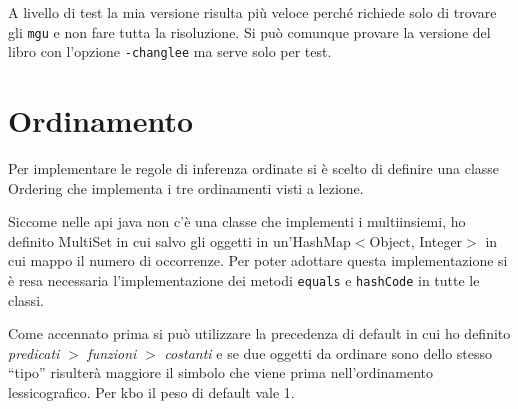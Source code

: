 \documentclass[a4paper,11pt]{article} %
\newcommand{\sintassi}{\texttt}
\newcommand{\classe}{\textsf}
\newcommand{\metodo}{\texttt}
\newcommand{\cod}{\lstset{basicstyle=\ttfamily}\lstinline}
\begin{document}
A livello di test la mia versione risulta più veloce perché richiede solo di trovare
gli \metodo{mgu} e non fare tutta la risoluzione. %
Si può comunque provare la versione del libro con %
l'opzione
\sintassi{-changlee} %
ma serve solo per test.


\section{Ordinamento}\label{sec: ordinamento}
Per implementare le regole di inferenza ordinate si è
scelto di definire una classe \classe{Ordering}
che implementa i tre ordinamenti visti a lezione.

Siccome nelle api java non c'è una classe che implementi
i multiinsiemi, ho definito \classe{MultiSet} in cui 
salvo gli oggetti in %
un'\classe{HashMap$<$Object, Integer$>$} in cui mappo il numero di occorrenze.  
Per poter adottare questa implementazione si è resa 
necessaria l'implementazione dei metodi \metodo{equals} e \metodo{hashCode}
in tutte le classi.

Come accennato prima si può utilizzare la precedenza di default
in cui ho definito
\emph{predicati} $>$ \emph{funzioni} $>$ \emph{costanti}
e se due oggetti da ordinare sono dello stesso ``tipo''
risulterà maggiore il simbolo che viene prima nell'ordinamento lessicografico.
Per kbo il peso di default vale 1.
\end{document}
